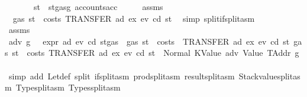 \begin{isabellebody}
\ \ \ \ \ \ \ {\isachardoublequoteopen}st{\isacharprime}{\kern0pt}\ {\isacharequal}{\kern0pt}\ st{\isasymlparr}gas{\isacharcolon}{\kern0pt}{\isacharequal}{\kern0pt}g{\isacharprime}{\kern0pt}{\isacharcomma}{\kern0pt}\ accounts{\isacharcolon}{\kern0pt}{\isacharequal}{\kern0pt}acc{\isasymrparr}{\isachardoublequoteclose}\isanewline
%
\isadelimproof
%
\endisadelimproof
%
\isatagproof
{}\isamarkupfalse%
\ {\isacharminus}{\kern0pt}\isanewline
\ \ \isamarkupfalse%
\ assms\ \isamarkupfalse%
\ {}{\isacharcolon}{\kern0pt}\ {\isachardoublequoteopen}gas\ st\ {\isachargreater}{\kern0pt}\ costs\ {\isacharparenleft}{\kern0pt}TRANSFER\ ad\ ex{\isacharparenright}{\kern0pt}\ ev\ cd\ st{\isachardoublequoteclose}\ \isamarkupfalse%
\ {\isacharparenleft}{\kern0pt}simp\ split{\isacharcolon}{\kern0pt}if{\isacharunderscore}{\kern0pt}split{\isacharunderscore}{\kern0pt}asm{\isacharparenright}{\kern0pt}\isanewline
\ \ \isamarkupfalse%
\ \isamarkupfalse%
\ assms\ {}\ \isamarkupfalse%
\ adv\ g\ \ {}{\isacharcolon}{\kern0pt}\ {\isachardoublequoteopen}expr\ ad\ ev\ cd\ {\isacharparenleft}{\kern0pt}st{\isasymlparr}gas\ {\isacharcolon}{\kern0pt}{\isacharequal}{\kern0pt}\ gas\ st\ {\isacharminus}{\kern0pt}\ costs\ \ {\isacharparenleft}{\kern0pt}TRANSFER\ ad\ ex{\isacharparenright}{\kern0pt}\ ev\ cd\ st{\isasymrparr}{\isacharparenright}{\kern0pt}\ {\isacharparenleft}{\kern0pt}gas\ st\ {\isacharminus}{\kern0pt}\ costs\ {\isacharparenleft}{\kern0pt}TRANSFER\ ad\ ex{\isacharparenright}{\kern0pt}\ ev\ cd\ st{\isacharparenright}{\kern0pt}\ {\isacharequal}{\kern0pt}\ Normal\ {\isacharparenleft}{\kern0pt}{\isacharparenleft}{\kern0pt}KValue\ adv{\isacharcomma}{\kern0pt}\ Value\ TAddr{\isacharparenright}{\kern0pt}{\isacharcomma}{\kern0pt}\ g{\isacharparenright}{\kern0pt}{\isachardoublequoteclose}\ \isamarkupfalse%
\ {\isacharparenleft}{\kern0pt}simp\ add{\isacharcolon}{\kern0pt}\ Let{\isacharunderscore}{\kern0pt}def\ split{\isacharcolon}{\kern0pt}\ if{\isacharunderscore}{\kern0pt}split{\isacharunderscore}{\kern0pt}asm\ prod{\isachardot}{\kern0pt}split{\isacharunderscore}{\kern0pt}asm\ result{\isachardot}{\kern0pt}split{\isacharunderscore}{\kern0pt}asm\ Stackvalue{\isachardot}{\kern0pt}split{\isacharunderscore}{\kern0pt}asm\ Type{\isachardot}{\kern0pt}split{\isacharunderscore}{\kern0pt}asm\ Types{\isachardot}{\kern0pt}split{\isacharunderscore}{\kern0pt}asm{\isacharparenright}{\kern0pt}\isanewline

\end{isabellebody}

